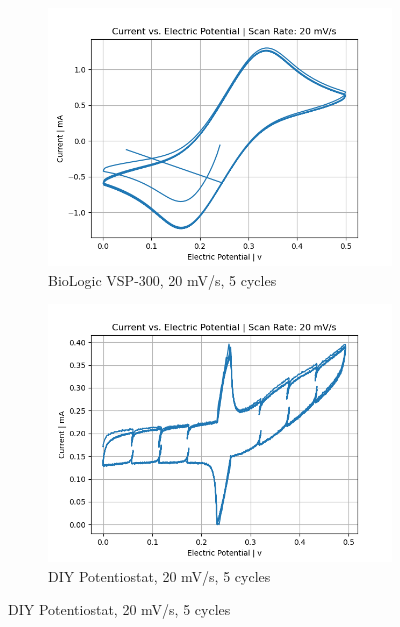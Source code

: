 \documentclass{article}
\begin{document}
\begin{figure}[H]
    \centering
    \begin{subfigure}[b]{0.45\textwidth}
    \includegraphics[width=\textwidth]{FECN_20mVs_5cycles_lab.png}
    \caption{BioLogic VSP-300, 20 mV/s, 5 cycles}
    \end{subfigure}
    \hfill
    \begin{subfigure}[b]{0.45\textwidth}
    \includegraphics[width=\textwidth]{FECN_20mVs_5cycles.png}
    \caption{DIY Potentiostat, 20 mV/s, 5 cycles}
    \end{subfigure}
    

\end{figure}
\end{document}
